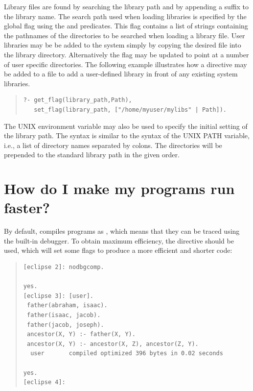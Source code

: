 Library files are found by searching the library path and by appending
a suffix to the library name.
The search path used when loading libraries is
specified by the global flag  using the
 and
 predicates.
This flag contains a list of strings containing the pathnames of the
directories to be searched when loading a library file.
User libraries may be be added to the system simply by copying the
desired file into the {\eclipse} library directory.
Alternatively the  flag may be updated to point
at a number of user specific directories. The following example illustrates
how a directive may be added to a file to add a user-defined library in front
of any existing system libraries.
\begin{quote}
\begin{verbatim}
?- get_flag(library_path,Path),
   set_flag(library_path, ["/home/myuser/mylibs" | Path]).
\end{verbatim}
\end{quote}
The UNIX environment variable  may also be used
to
specify the initial setting of the library path.
The syntax is similar to the syntax of the UNIX PATH variable, i.e.,
a list of directory names separated by colons.
The directories will be prepended to the standard library path in the
given order.

\section{How do I make my programs run faster?}

By default, {\eclipse} compiles programs as , which
means that they can be traced using the built-in debugger.
To obtain maximum efficiency, the directive
should be used, which will set some flags to produce a more efficient
and shorter code:
\begin{quote}
\begin{verbatim}
[eclipse 2]: nodbgcomp.

yes.
[eclipse 3]: [user].
 father(abraham, isaac).
 father(isaac, jacob).
 father(jacob, joseph).
 ancestor(X, Y) :- father(X, Y).
 ancestor(X, Y) :- ancestor(X, Z), ancestor(Z, Y).
  user       compiled optimized 396 bytes in 0.02 seconds

yes.
[eclipse 4]:
\end{verbatim}
\end{quote}


